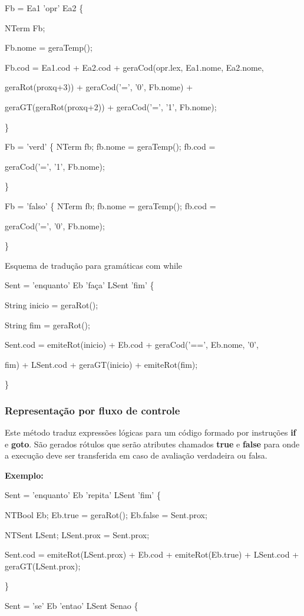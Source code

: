 \documentclass[11pt]{article}
\begin{document}
Fb = Ea1 'opr' Ea2 \{

NTerm Fb;

Fb.nome = geraTemp();

Fb.cod = Ea1.cod + Ea2.cod + geraCod(opr.lex, Ea1.nome,
Ea2.nome,

geraRot(proxq+3)) + geraCod('=', '0', Fb.nome) +

geraGT(geraRot(proxq+2)) + geraCod('=', '1', Fb.nome);

\}

Fb = 'verd' \{ NTerm fb; fb.nome = geraTemp(); fb.cod =

geraCod('=', '1', Fb.nome); 

\}

Fb = 'falso' \{ NTerm fb; fb.nome = geraTemp(); fb.cod =

geraCod('=', '0', Fb.nome);

\}


Esquema de tradução para gramáticas com while

Sent = 'enquanto' Eb 'faça' LSent 'fim' \{

String inicio = geraRot();

String fim = geraRot();

Sent.cod = emiteRot(inicio) + Eb.cod + geraCod('==', Eb.nome, '0',

fim) + LSent.cod + geraGT(inicio) + emiteRot(fim);

\}

\subsubsection{Representação por fluxo de controle}
\label{sec:org149db06}
Este método traduz expressões lógicas para um código formado por
instruções \textbf{if} e \textbf{goto}. São gerados rótulos que serão atributes
chamados \textbf{true} e \textbf{false} para onde a execução deve ser
transferida em caso de avaliação verdadeira ou falsa.

\textbf{Exemplo:}

Sent = 'enquanto' Eb 'repita' LSent 'fim' \{

NTBool Eb; Eb.true = geraRot(); Eb.false = Sent.prox;

NTSent LSent; LSent.prox = Sent.prox;

Sent.cod = emiteRot(LSent.prox) + Eb.cod + emiteRot(Eb.true) + LSent.cod + geraGT(LSent.prox);

\}

Sent = 'se' Eb 'entao' LSent Senao \{
\end{document}
